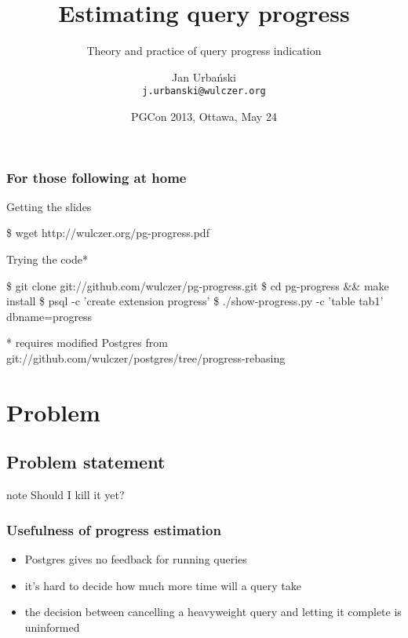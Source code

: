 \documentclass{beamer}
\title{Estimating query progress}
\subtitle{Theory and practice of query progress indication}
\author[Jan Urbański]{Jan Urbański \\ \texttt{j.urbanski@wulczer.org}}
\institute{Ducksboard}
\date[PGCon 2013]{PGCon 2013, Ottawa, May 24}
\begin{document}
\frame{\titlepage}


\begin{frame}[fragile]
  \frametitle{For those following at home}

  \begin{block}{Getting the slides}
    \begin{semiverbatim}
    \$ wget http://wulczer.org/pg-progress.pdf
    \end{semiverbatim}
  \end{block}

  \begin{block}{Trying the code\alert{*}}
    \begin{semiverbatim}
    \$ git clone git://github.com/wulczer/pg-progress.git
    \$ cd pg-progress && make install
    \$ psql -c 'create extension progress'
    \$ ./show-progress.py -c 'table tab1' dbname=progress
    \end{semiverbatim}
  \end{block}

  {\tiny\alert{*} requires modified Postgres from git://github.com/wulczer/postgres/tree/progress-rebasing}
\end{frame}

\begin{frame}
  \tableofcontents
\end{frame}

\section{Problem}
\subsection{Problem statement}

\begin{frame}
\begin{beamercolorbox}[center]{note}
  \Huge Should I kill it yet?
\end{beamercolorbox}
\end{frame}

\begin{frame}
  \frametitle{Usefulness of progress estimation}

  \begin{itemize}
  \item Postgres gives no feedback for running queries
  \item it's hard to decide how much more time will a query take
  \item the decision between cancelling a heavyweight query and letting it
    complete is uninformed
  \end{itemize}
\end{frame}
\end{document}
